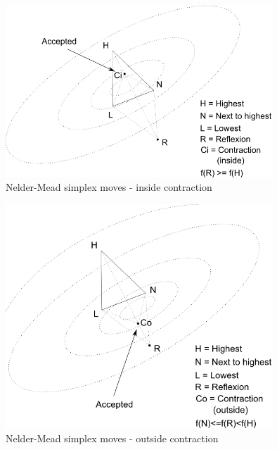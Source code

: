 \begin{figure}
\begin{center}
\includegraphics[width=10cm]{nelder-mead-contract-inside.png}
\end{center}
\caption{Nelder-Mead simplex moves - inside contraction}
\label{fig-nm-moves-insidecontraction}
\end{figure}

\begin{figure}
\begin{center}
\includegraphics[width=10cm]{nelder-mead-contract-outside.png}
\end{center}
\caption{Nelder-Mead simplex moves - outside contraction}
\label{fig-nm-moves-outsidecontraction}
\end{figure}

